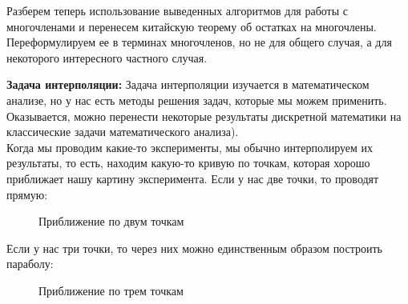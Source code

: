 \documentclass[russian]{lecture-notes}
\theoremstyle{definition}
\begin{document}
	Разберем теперь использование выведенных алгоритмов для работы с многочленами и перенесем китайскую теорему об остатках на многочлены. Переформулируем ее в терминах многочленов, но не для общего случая, а для некоторого интересного частного случая.
	
	\noindent\textbf{Задача интерполяции:} Задача интерполяции изучается в математическом анализе, но у нас есть методы решения задач, которые мы можем применить. Оказывается, можно перенести некоторые результаты дискретной математики на классические задачи математического анализа). \\

	Когда мы проводим какие-то эксперименты, мы обычно интерполируем их результаты, то есть, находим какую-то кривую по точкам, которая хорошо приближает нашу картину эксперимента. Если у нас две точки, то проводят прямую:
	\begin{figure}[H]
		\begin{subfigure}[H]{0.49\linewidth}
			\centering
		\end{subfigure}
		\hfill
		\begin{subfigure}[H]{0.49\linewidth}
			\centering
		\end{subfigure}
		\caption{\small Приближение по двум точкам}
	\end{figure}
	
	Если у нас три точки, то через них можно единственным образом построить параболу:
	\begin{figure}[H]
		\centering 
		\caption{\small Приближение по трем точкам}
	\end{figure}
	
\end{document}
